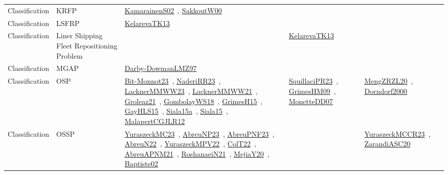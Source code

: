 {\begin{longtable}{lp{3cm}>{\raggedright\arraybackslash}p{6cm}>{\raggedright\arraybackslash}p{6cm}>{\raggedright\arraybackslash}p{8cm}}
Classification & KRFP & \href{../works/KamarainenS02.pdf}{KamarainenS02}~\cite{KamarainenS02}, \href{../works/SakkoutW00.pdf}{SakkoutW00}~\cite{SakkoutW00} &  & \\
Classification & LSFRP & \href{../works/KelarevaTK13.pdf}{KelarevaTK13}~\cite{KelarevaTK13} &  & \\
Classification & Liner Shipping Fleet Repositioning Problem &  & \href{../works/KelarevaTK13.pdf}{KelarevaTK13}~\cite{KelarevaTK13} & \\
Classification & MGAP & \href{../works/Darby-DowmanLMZ97.pdf}{Darby-DowmanLMZ97}~\cite{Darby-DowmanLMZ97} &  & \\
Classification & OSP & \href{../works/Bit-Monnot23.pdf}{Bit-Monnot23}~\cite{Bit-Monnot23}, \href{../works/NaderiRR23.pdf}{NaderiRR23}~\cite{NaderiRR23}, \href{../works/LacknerMMWW23.pdf}{LacknerMMWW23}~\cite{LacknerMMWW23}, \href{../works/LacknerMMWW21.pdf}{LacknerMMWW21}~\cite{LacknerMMWW21}, \href{../works/Groleaz21.pdf}{Groleaz21}~\cite{Groleaz21}, \href{../works/GombolayWS18.pdf}{GombolayWS18}~\cite{GombolayWS18}, \href{../works/GrimesH15.pdf}{GrimesH15}~\cite{GrimesH15}, \href{../works/GayHLS15.pdf}{GayHLS15}~\cite{GayHLS15}, \href{../works/Siala15a.pdf}{Siala15a}~\cite{Siala15a}, \href{../works/Siala15.pdf}{Siala15}~\cite{Siala15}, \href{../works/MalapertCGJLR12.pdf}{MalapertCGJLR12}~\cite{MalapertCGJLR12} & \href{../works/SquillaciPR23.pdf}{SquillaciPR23}~\cite{SquillaciPR23}, \href{../works/GrimesHM09.pdf}{GrimesHM09}~\cite{GrimesHM09}, \href{../works/MonetteDD07.pdf}{MonetteDD07}~\cite{MonetteDD07} & \href{../works/MengZRZL20.pdf}{MengZRZL20}~\cite{MengZRZL20}, \href{../works/Dorndorf2000.pdf}{Dorndorf2000}~\cite{Dorndorf2000}\\
Classification & OSSP & \href{../works/YuraszeckMC23.pdf}{YuraszeckMC23}~\cite{YuraszeckMC23}, \href{../works/AbreuNP23.pdf}{AbreuNP23}~\cite{AbreuNP23}, \href{../works/AbreuPNF23.pdf}{AbreuPNF23}~\cite{AbreuPNF23}, \href{../works/AbreuN22.pdf}{AbreuN22}~\cite{AbreuN22}, \href{../works/YuraszeckMPV22.pdf}{YuraszeckMPV22}~\cite{YuraszeckMPV22}, \href{../works/ColT22.pdf}{ColT22}~\cite{ColT22}, \href{../works/AbreuAPNM21.pdf}{AbreuAPNM21}~\cite{AbreuAPNM21}, \href{../works/RoshanaeiN21.pdf}{RoshanaeiN21}~\cite{RoshanaeiN21}, \href{../works/MejiaY20.pdf}{MejiaY20}~\cite{MejiaY20}, \href{../works/Baptiste02.pdf}{Baptiste02}~\cite{Baptiste02} &  & \href{../works/YuraszeckMCCR23.pdf}{YuraszeckMCCR23}~\cite{YuraszeckMCCR23}, \href{../works/ZarandiASC20.pdf}{ZarandiASC20}~\cite{ZarandiASC20}\\

\end{longtable}}

